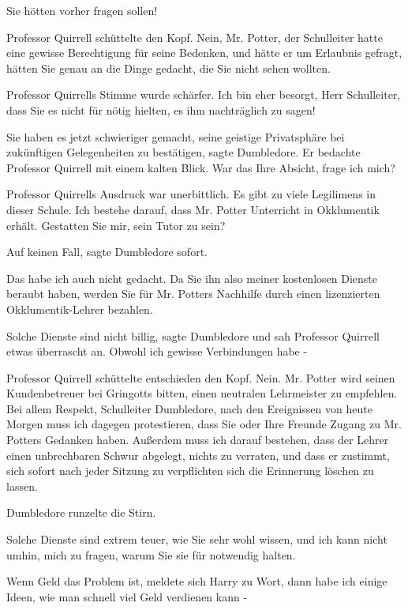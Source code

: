 \glqq Sie hötten vorher fragen sollen!\grqq{}

Professor Quirrell schüttelte den Kopf. \glqq Nein, Mr. Potter, der Schulleiter
hatte eine gewisse Berechtigung für seine Bedenken, und hätte er um Erlaubnis
gefragt, hätten Sie genau an die Dinge gedacht, die Sie nicht sehen
wollten.\grqq{}

Professor Quirrells Stimme wurde schärfer. \glqq Ich bin eher besorgt, Herr
Schulleiter, dass Sie es nicht für nötig hielten, es ihm nachträglich zu
sagen!\grqq{}

\glqq Sie haben es jetzt schwieriger gemacht, seine geistige Privatsphäre bei
zukünftigen Gelegenheiten zu bestätigen\grqq{}, sagte Dumbledore. Er bedachte
Professor Quirrell mit einem kalten Blick. \glqq War das Ihre Absicht, frage ich
mich?\grqq{}

Professor Quirrells Ausdruck war unerbittlich. \glqq Es gibt zu viele Legilimens
in dieser Schule. Ich bestehe darauf, dass Mr. Potter Unterricht in Okklumentik
erhält. Gestatten Sie mir, sein Tutor zu sein?\grqq{}

\glqq Auf keinen Fall\grqq{}, sagte Dumbledore sofort.

\glqq Das habe ich auch nicht gedacht. Da Sie ihn also meiner kostenlosen
Dienste beraubt haben, werden Sie für Mr. Potters Nachhilfe durch einen
lizenzierten Okklumentik-Lehrer bezahlen.\grqq{}

\glqq Solche Dienste sind nicht billig\grqq{}, sagte Dumbledore und sah
Professor Quirrell etwas überrascht an. \glqq Obwohl ich gewisse Verbindungen
habe -\grqq{}

Professor Quirrell schüttelte entschieden den Kopf. \glqq Nein. Mr. Potter wird
seinen Kundenbetreuer bei Gringotts bitten, einen neutralen Lehrmeister zu
empfehlen. Bei allem Respekt, Schulleiter Dumbledore, nach den Ereignissen von
heute Morgen muss ich dagegen protestieren, dass Sie oder Ihre Freunde Zugang zu
Mr. Potters Gedanken haben. Außerdem muss ich darauf bestehen, dass der Lehrer
einen unbrechbaren Schwur abgelegt, nichts zu verraten, und dass er zustimmt,
sich sofort nach jeder Sitzung zu verpflichten sich die Erinnerung löschen zu
lassen.\grqq{}

Dumbledore runzelte die Stirn.

\glqq Solche Dienste sind extrem teuer, wie Sie sehr wohl wissen, und ich kann
nicht umhin, mich zu fragen, warum Sie sie für notwendig halten.\grqq{}

\glqq Wenn Geld das Problem ist\grqq{}, meldete sich Harry zu Wort, \glqq dann
habe ich einige Ideen, wie man schnell viel Geld verdienen kann -\grqq{}

